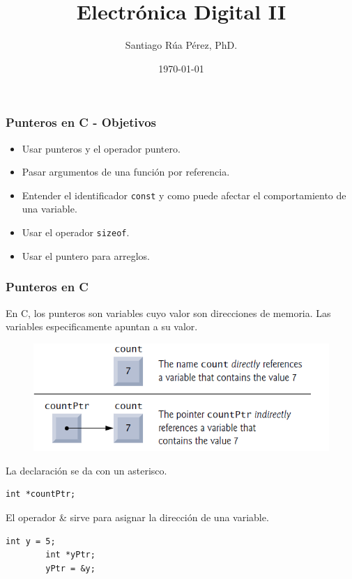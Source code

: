 \documentclass[10.5pt,scale=1.0,t,aspectratio=169,hyperref={pdfpagelabels=false}]{beamer}
\title{Electrónica Digital II}
\author{Santiago Rúa Pérez, PhD.}
\date{\today}
\begin{document}
\begin{frame}
	\titlepage
\end{frame}
\frame{
	\begin{center}
		\LARGE \textcolor{blue}{PUNTEROS EN C}
	\end{center}
	
}

\begin{frame}
	\frametitle{Punteros en C - Objetivos}
	\begin{itemize}
	\item Usar punteros y el operador puntero.
	\item Pasar argumentos de una función por referencia.
	\item Entender el identificador \texttt{const} y como puede afectar el comportamiento de una variable.
	\item Usar el operador \texttt{sizeof}.
	\item Usar el puntero para arreglos. 
	\end{itemize}
\end{frame}
\begin{frame}[fragile]
\frametitle{Punteros en C}
	En C, los punteros son variables cuyo valor son direcciones de memoria. Las variables especificamente apuntan a su valor. 
	\begin{figure}
		\centering
		\includegraphics[scale=0.7]{Puntero}
	\end{figure}

	La declaración se da con un asterisco.
	
	\begin{lstlisting}[style=CStyle]
		int *countPtr;
	\end{lstlisting}
	El operador \& sirve para asignar la dirección de una variable.
	\begin{lstlisting}[style=CStyle]
		int y = 5;
		int *yPtr;
		yPtr = &y;
	\end{lstlisting}
\end{frame}
\end{document}
